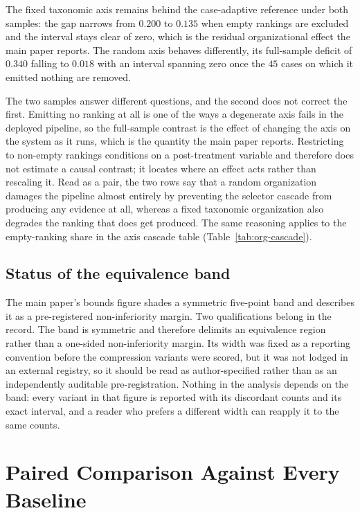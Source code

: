 \documentclass[letterpaper]{article}
\begin{document}
The fixed taxonomic axis remains behind the case-adaptive reference under both samples: the gap narrows from $0.200$ to $0.135$ when empty rankings are excluded and the interval stays clear of zero, which is the residual organizational effect the main paper reports.
The random axis behaves differently, its full-sample deficit of $0.340$ falling to $0.018$ with an interval spanning zero once the $45$ cases on which it emitted nothing are removed.

The two samples answer different questions, and the second does not correct the first.
Emitting no ranking at all is one of the ways a degenerate axis fails in the deployed pipeline, so the full-sample contrast is the effect of changing the axis on the system as it runs, which is the quantity the main paper reports.
Restricting to non-empty rankings conditions on a post-treatment variable and therefore does not estimate a causal contrast; it locates where an effect acts rather than rescaling it.
Read as a pair, the two rows say that a random organization damages the pipeline almost entirely by preventing the selector cascade from producing any evidence at all, whereas a fixed taxonomic organization also degrades the ranking that does get produced.
The same reasoning applies to the empty-ranking share in the axis cascade table (Table~\ref{tab:org-cascade}).

\subsection{Status of the equivalence band}

The main paper's bounds figure shades a symmetric five-point band and describes it as a pre-registered non-inferiority margin.
Two qualifications belong in the record.
The band is symmetric and therefore delimits an equivalence region rather than a one-sided non-inferiority margin.
Its width was fixed as a reporting convention before the compression variants were scored, but it was not lodged in an external registry, so it should be read as author-specified rather than as an independently auditable pre-registration.
Nothing in the analysis depends on the band: every variant in that figure is reported with its discordant counts and its exact interval, and a reader who prefers a different width can reapply it to the same counts.

\section{Paired Comparison Against Every Baseline}
\label{sec:paired-baselines}
\end{document}
